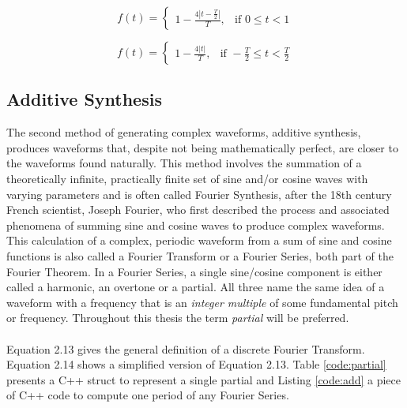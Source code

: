 \documentclass[12pt,twoside]{report}
\begin{document}
\begin{multicols}{2}

  \begin{equation}
    f(t) =
    \begin{cases}
      1 - \frac{4 |t - \frac{T}{2}|}{T},& \text{if } 0 \leq t < 1
    \end{cases}
    \label{eq:dtri3}
  \end{equation}

  \begin{equation}
    f(t) =
    \begin{cases}
      1 - \frac{4 |t|}{T},& \text{if } -\frac{T}{2} \leq t < \frac{T}{2}
    \end{cases}
    \label{eq:dtri4}
  \end{equation}

\end{multicols}

\begin{table}
\end{table}

\subsection{Additive Synthesis}

The second method of generating complex waveforms, additive synthesis, produces waveforms that, despite not being mathematically perfect, are closer to the waveforms found naturally. This method involves the summation of a theoretically infinite, practically finite set of sine and/or cosine waves with varying parameters and is often called Fourier Synthesis, after the 18th century French scientist, Joseph Fourier, who first described the process and associated phenomena of summing sine and cosine waves to produce complex waveforms. This calculation of a complex, periodic waveform from a sum of sine and cosine functions is also called a Fourier Transform or a Fourier Series, both part of the Fourier Theorem. In a Fourier Series, a single sine/cosine component is either called a harmonic, an overtone or a partial. All three name the same idea of a waveform with a frequency that is an \emph{integer multiple} of some fundamental pitch or frequency.  Throughout this thesis the term \emph{partial} will be preferred. \\\\Equation 2.13 gives the general definition of a discrete Fourier Transform. Equation 2.14 shows a simplified version of Equation 2.13. Table \ref{code:partial} presents a C++ struct to represent a single partial and Listing \ref{code:add} a piece of C++ code to compute one period of any Fourier Series.
\end{document}
